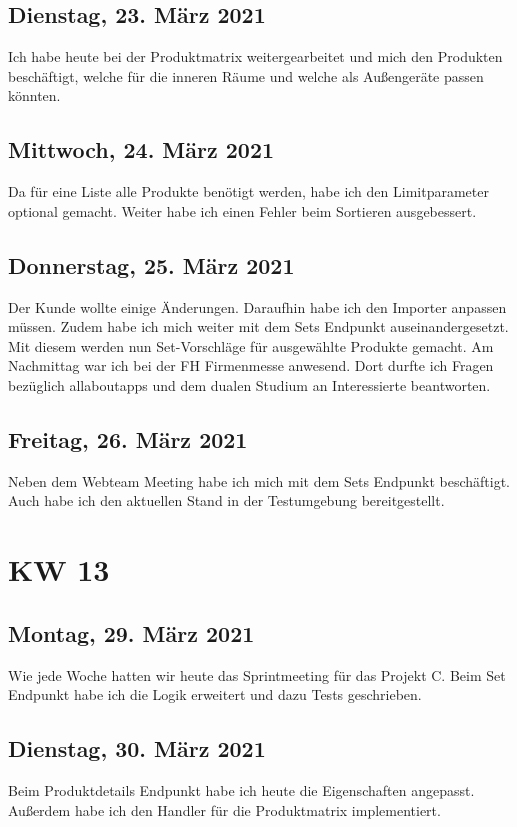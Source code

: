 \section{Dienstag, 23. März 2021}
Ich habe heute bei der Produktmatrix weitergearbeitet und mich den Produkten beschäftigt, welche für die inneren Räume und welche als Außengeräte passen könnten.

\section{Mittwoch, 24. März 2021}
Da für eine Liste alle Produkte benötigt werden, habe ich den Limitparameter optional gemacht. Weiter habe ich einen Fehler beim Sortieren ausgebessert.

\section{Donnerstag, 25. März 2021}
Der Kunde wollte einige Änderungen. Daraufhin habe ich den Importer anpassen müssen. Zudem habe ich mich weiter mit dem Sets Endpunkt auseinandergesetzt. Mit diesem werden nun Set-Vorschläge für ausgewählte Produkte gemacht. Am Nachmittag war ich bei der FH Firmenmesse anwesend. Dort durfte ich Fragen bezüglich allaboutapps und dem dualen Studium an Interessierte beantworten.

\section{Freitag, 26. März 2021}
Neben dem Webteam Meeting habe ich mich mit dem Sets Endpunkt beschäftigt. Auch habe ich den aktuellen Stand in der Testumgebung bereitgestellt.


\chapter{KW 13}

\section{Montag, 29. März 2021}
Wie jede Woche hatten wir heute das Sprintmeeting für das Projekt C. Beim Set Endpunkt habe ich die Logik erweitert und dazu Tests geschrieben.

\section{Dienstag, 30. März 2021}
Beim Produktdetails Endpunkt habe ich heute die Eigenschaften angepasst. Außerdem habe ich den Handler für die Produktmatrix implementiert.

